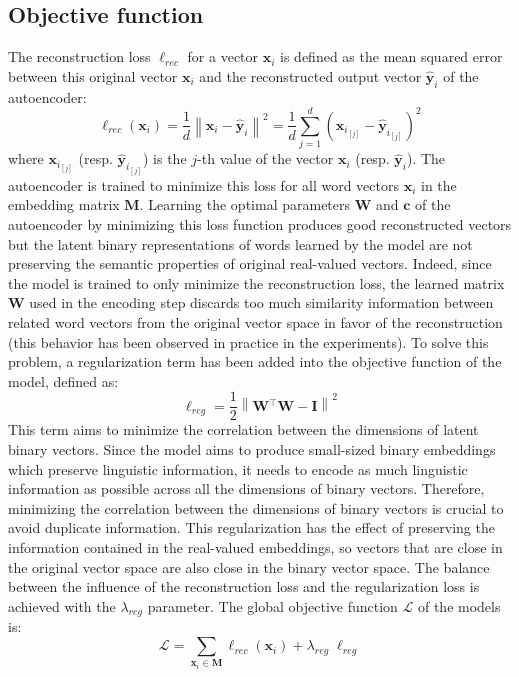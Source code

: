   \subsection{Objective function}
    \label{ch06:subsec:objective-function}
    The reconstruction loss $\ell_{rec}$ for a vector $\mathbf{x}_i$ is defined
    as the mean squared error between this original vector $\mathbf{x}_i$ and
    the reconstructed output vector $\hat{\mathbf{y}}_i$ of the autoencoder:
    \begin{equation}
      \ell_{rec}(\mathbf{x}_i) = \frac{1}{d} \left\lVert
        \mathbf{x}_i - \hat{\mathbf{y}}_i \right\rVert^2
                               = \frac{1}{d} \sum_{j=1}^d
        (\mathbf{x}_{i_{[j]}} - \hat{\mathbf{y}}_{i_{[j]}})^2
    \end{equation}
    where $\mathbf{x}_{i_{[j]}}$ (resp. $\hat{\mathbf{y}}_{i_{[j]}}$) is the
    $j$-th value of the vector $\mathbf{x}_i$ (resp. $\hat{\mathbf{y}}_{i}$).
    The autoencoder is trained to minimize this loss for all word vectors
    $\mathbf{x}_i$ in the embedding matrix $\mathbf{M}$. Learning the optimal
    parameters $\mathbf{W}$ and $\mathbf{c}$ of the autoencoder by minimizing
    this loss function produces good reconstructed vectors but the latent binary
    representations of words learned by the model are not preserving the
    semantic properties of original real-valued vectors. Indeed, since the model
    is trained to only minimize the reconstruction loss, the learned matrix
    $\mathbf{W}$ used in the encoding step discards too much similarity
    information between related word vectors from the original vector space in
    favor of the reconstruction (this behavior has been observed in practice in
    the experiments). To solve this problem, a regularization term has been
    added into the objective function of the model, defined as:
    \begin{equation}
      \ell_{reg} = \frac{1}{2} \left\lVert \mathbf{W}{}^\top \mathbf{W}
                                            - \mathbf{I} \right\rVert^2
    \end{equation}
    This term aims to minimize the correlation between the dimensions of latent
    binary vectors. Since the model aims to produce small-sized binary
    embeddings which preserve linguistic information, it needs to encode as much
    linguistic information as possible across all the dimensions of binary
    vectors. Therefore, minimizing the correlation between the dimensions of
    binary vectors is crucial to avoid duplicate information. This
    regularization has the effect of preserving the information contained in the
    real-valued embeddings, so vectors that are close in the original vector
    space are also close in the binary vector space. The balance between the
    influence of the reconstruction loss and the regularization loss is achieved
    with the $\lambda_{reg}$ parameter. The global objective function
    $\mathcal{L}$ of the models is:
    \begin{equation}
      \mathcal{L} = \sum_{\mathbf{x}_i \in \mathbf{M}}
                    \ell_{rec}(\mathbf{x}_i) + \lambda_{reg} \; \ell_{reg}
    \end{equation}

